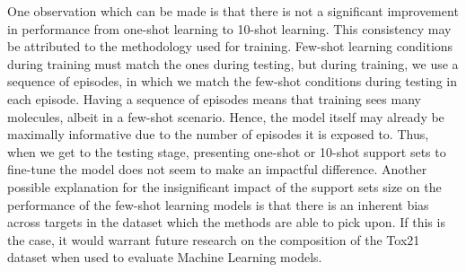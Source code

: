 \documentclass[journal=jcisd8,manuscript=article]{achemso} %
\begin{document}
One observation which can be made is that there is not a significant improvement in performance from one-shot learning to 10-shot learning. This consistency may be attributed to the methodology used for training. Few-shot learning conditions during training must match the ones during testing, but during training, we use a sequence of episodes, in which we match the few-shot conditions during testing in each episode. Having a sequence of episodes means that training sees many molecules, albeit in a few-shot scenario. Hence, the model itself may already be maximally informative due to the number of episodes it is exposed to. Thus, when we get to the testing stage, presenting one-shot or 10-shot support sets to fine-tune the model does not seem to make an impactful difference. Another possible explanation for the insignificant impact of the support sets size on the performance of the few-shot learning models is that there is an inherent bias across targets in the dataset which the methods are able to pick upon. If this is the case, it would warrant future research on the composition of the Tox21 dataset when used to evaluate Machine Learning models. 
\end{document}
